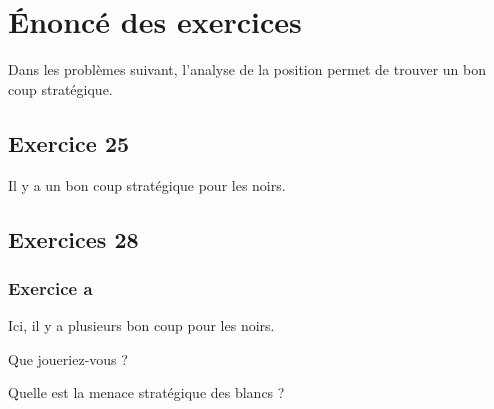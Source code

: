 
\newpage

\section{Énoncé des exercices}

Dans les problèmes suivant, l'analyse de la position permet de trouver un bon coup stratégique.

\subsection{Exercice 25}%

\newgame
{}
\begin{minipage}{0.45\textwidth}
\hspace{0.7cm}Il y a un bon coup stratégique pour les noirs.
\vspace{0.5cm}

\end{minipage}
\hfill
\begin{minipage}{0.45\textwidth}
\chessboard[
inverse,markstyle=leftborder,
]%
\end{minipage}

\subsection{Exercices 28} %
\subsubsection{Exercice a} %

\newgame
{}
\begin{minipage}{0.45\textwidth}
\hspace{0.7cm} Ici, il y a plusieurs bon coup pour les noirs.
\vspace{0.5cm}

\hspace{0.7cm} Que joueriez-vous ?
\vspace{0.5cm}

\hspace{0.7cm} Quelle est la menace stratégique des blancs ? %
\vspace{0.5cm}

\end{minipage}
\hfill
\begin{minipage}{0.45\textwidth}
\chessboard[
inverse,markstyle=leftborder,
]%
\end{minipage}

